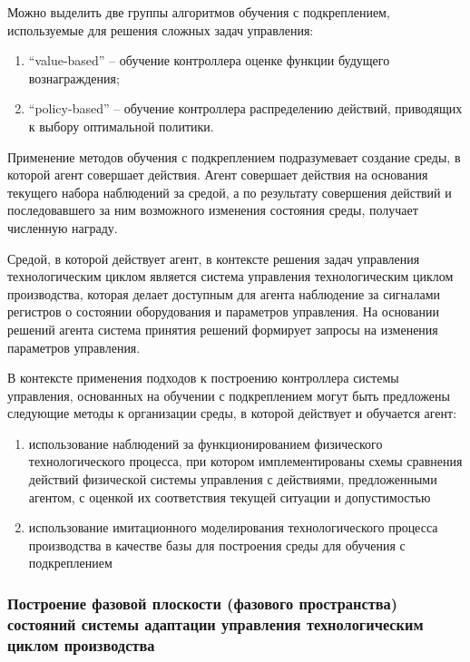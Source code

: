 Можно выделить две группы алгоритмов обучения с подкреплением, используемые для решения сложных задач управления:

\begin{enumerate}
    \item ``value-based'' – обучение контроллера оценке функции будущего вознаграждения;
    \item ``policy-based'' – обучение контроллера распределению действий, приводящих к выбору оптимальной политики.
\end{enumerate}


Применение методов обучения с подкреплением подразумевает создание среды, в которой агент совершает действия. Агент совершает действия на основания текущего набора наблюдений за средой, а по результату совершения действий и последовавшего за ним возможного изменения состояния среды, получает численную награду.


Средой, в которой действует агент, в контексте решения задач управления технологическим циклом является система управления технологическим циклом производства, которая делает доступным для агента наблюдение за сигналами регистров о состоянии оборудования и параметров управления. На основании решений агента система принятия решений формирует запросы на изменения параметров управления.


В контексте применения подходов к построению контроллера системы управления, основанных на обучении с подкреплением могут быть предложены следующие методы к организации среды, в которой действует и обучается агент:

\begin{enumerate}
    \item использование наблюдений за функционированием физического технологического процесса, при котором имплементированы схемы сравнения действий физической системы управления с действиями, предложенными агентом, с оценкой их соответствия текущей ситуации и допустимостью
    \item использование имитационного моделирования технологического процесса производства в качестве базы для построения среды для обучения с подкреплением
\end{enumerate}





\subsubsection{Построение фазовой плоскости (фазового пространства) состояний системы адаптации управления технологическим циклом производства}

